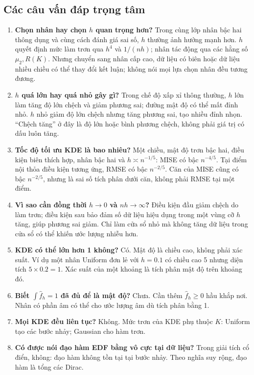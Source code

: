 \documentclass[11pt,a4paper]{article}
\newcommand{\fh}{\widehat f_h}
\begin{document}
\subsection{Các câu vấn đáp trọng tâm}
\begin{enumerate}[label=\textbf{\arabic*.},itemsep=7pt]
\item \textbf{Chọn nhân hay chọn $h$ quan trọng hơn?}
Trong cùng lớp nhân bậc hai thông dụng và cùng cách đánh giá sai số, $h$ thường ảnh hưởng mạnh hơn. $h$ quyết định mức làm trơn qua $h^4$ và $1/(nh)$; nhân tác động qua các hằng số $\mu_2,R(K)$. Nhưng chuyển sang nhân cấp cao, dữ liệu có biên hoặc dữ liệu nhiều chiều có thể thay đổi kết luận; không nói mọi lựa chọn nhân đều tương đương.
\item \textbf{$h$ quá lớn hay quá nhỏ gây gì?}
Trong chế độ xấp xỉ thông thường, $h$ lớn làm tăng độ lớn chệch và giảm phương sai; đường mật độ có thể mất đỉnh nhỏ. $h$ nhỏ giảm độ lớn chệch nhưng tăng phương sai, tạo nhiều đỉnh nhọn. ``Chệch tăng'' ở đây là độ lớn hoặc bình phương chệch, không phải giá trị có dấu luôn tăng.
\item \textbf{Tốc độ tối ưu KDE là bao nhiêu?}
Một chiều, mật độ trơn bậc hai, điều kiện biên thích hợp, nhân bậc hai và $h\asymp n^{-1/5}$: MISE có bậc $n^{-4/5}$. Tại điểm nội thỏa điều kiện tương ứng, RMSE có bậc $n^{-2/5}$. Căn của MISE cũng có bậc $n^{-2/5}$, nhưng là sai số tích phân dưới căn, không phải RMSE tại một điểm.
\item \textbf{Vì sao cần đồng thời $h\to0$ và $nh\to\infty$?}
Điều kiện đầu giảm chệch do làm trơn; điều kiện sau bảo đảm số dữ liệu hiệu dụng trong một vùng cỡ $h$ tăng, giúp phương sai giảm. Chỉ làm cửa sổ nhỏ mà không tăng dữ liệu trong cửa sổ có thể khiến ước lượng nhiễu hơn.
\item \textbf{KDE có thể lớn hơn 1 không?}
Có. Mật độ là chiều cao, không phải xác suất. Ví dụ một nhân Uniform đơn lẻ với $h=0.1$ có chiều cao 5 nhưng diện tích $5\times0.2=1$. Xác suất của một khoảng là tích phân mật độ trên khoảng đó.
\item \textbf{Biết $\int\fh=1$ đã đủ để là mật độ?}
Chưa. Cần thêm $\fh\geq0$ hầu khắp nơi. Nhân có phần âm có thể cho ước lượng âm dù tích phân bằng 1.
\item \textbf{Mọi KDE đều liên tục?}
Không. Mức trơn của KDE phụ thuộc $K$: Uniform tạo các bước nhảy; Gaussian cho hàm trơn.
\item \textbf{Có được nói đạo hàm EDF bằng vô cực tại dữ liệu?}
Trong giải tích cổ điển, không: đạo hàm không tồn tại tại bước nhảy. Theo nghĩa suy rộng, đạo hàm là tổng các Dirac.

\end{enumerate}
\end{document}
